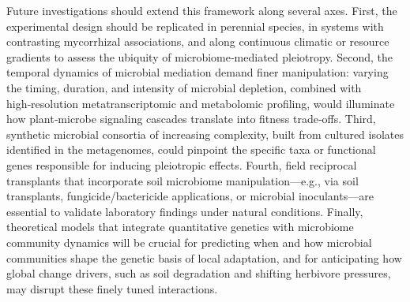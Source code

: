 \documentclass{article}
\begin{document}
Future investigations should extend this framework along several axes. First, the experimental design should be replicated in perennial species, in systems with contrasting mycorrhizal associations, and along continuous climatic or resource gradients to assess the ubiquity of microbiome‑mediated pleiotropy. Second, the temporal dynamics of microbial mediation demand finer manipulation: varying the timing, duration, and intensity of microbial depletion, combined with high‑resolution metatranscriptomic and metabolomic profiling, would illuminate how plant‑microbe signaling cascades translate into fitness trade‑offs. Third, synthetic microbial consortia of increasing complexity, built from cultured isolates identified in the metagenomes, could pinpoint the specific taxa or functional genes responsible for inducing pleiotropic effects. Fourth, field reciprocal transplants that incorporate soil microbiome manipulation—e.g., via soil transplants, fungicide/bactericide applications, or microbial inoculants—are essential to validate laboratory findings under natural conditions. Finally, theoretical models that integrate quantitative genetics with microbiome community dynamics will be crucial for predicting when and how microbial communities shape the genetic basis of local adaptation, and for anticipating how global change drivers, such as soil degradation and shifting herbivore pressures, may disrupt these finely tuned interactions.



\end{document}
